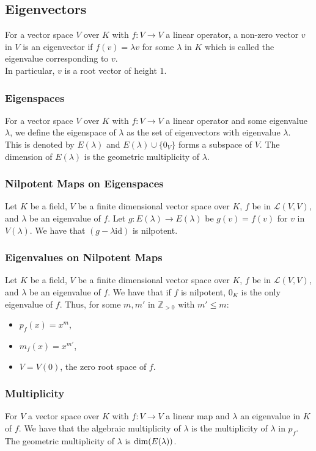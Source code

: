 \subsection{Eigenvectors}

For a vector space $V$ over $K$ with $f: V \to V$ a 
linear operator, a non-zero vector $v$ in $V$ is an eigenvector
if $f(v) = \lambda v$ for some $\lambda$ in $K$ which is
called the eigenvalue corresponding to $v$.
\\[\baselineskip]
In particular, $v$ is a root vector of height $1$.

\subsubsection{Eigenspaces}

For a vector space $V$ over $K$ with $f: V \to V$ a 
linear operator and some eigenvalue $\lambda$, we define the
eigenspace of $\lambda$ as the set of eigenvectors with eigenvalue
$\lambda$.
\\[\baselineskip]
This is denoted by $E(\lambda)$ and $E(\lambda)\cup\{0_{V}\}$ forms
a subspace of $V$. The dimension of $E(\lambda)$ is the geometric
multiplicity of $\lambda$.

\subsubsection{Nilpotent Maps on Eigenspaces}

Let $K$ be a field, $V$ be a finite dimensional vector space over $K$, 
$f$ be in $\mathcal{L}(V, V)$, and $\lambda$ be an eigenvalue of $f$. 
Let $g: E(\lambda) \to E(\lambda)$ be $g(v) = f(v)$ for $v$ in $V(\lambda)$. 
We have that $(g - \lambda\text{id})$ is nilpotent.

\subsubsection{Eigenvalues on Nilpotent Maps}

Let $K$ be a field, $V$ be a finite dimensional vector space over $K$, 
$f$ be in $\mathcal{L}(V, V)$, and $\lambda$ be an eigenvalue of $f$.
We have that if $f$ is nilpotent, $0_K$ is the only eigenvalue of $f$. 
Thus, for some $m, m'$ in $\mathbb{Z}_{>0}$ with $m' \leq m$: \begin{itemize}
  \item $p_f(x) = x^m$,
  \item $m_f(x) = x^{m'}$,
  \item $V = V(0)$, the zero root space of $f$.
\end{itemize}

\subsubsection{Multiplicity}

For $V$ a vector space over $K$ with $f : V \to V$ a linear map 
and $\lambda$ an 
eigenvalue in $K$ of $f$. We have that the algebraic multiplicity of
$\lambda$ is the multiplicity of $\lambda$ in $p_f$. The geometric
multiplicity of $\lambda$ is $\operatorname{dim}(E(\lambda))$.
